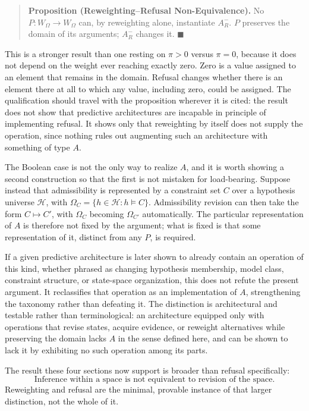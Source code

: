 \documentclass[11pt]{article}
\begin{document}
\begin{quote}
\textbf{Proposition (Reweighting–Refusal Non-Equivalence).} No $P : W_\Omega \rightarrow W_\Omega$ can, by reweighting alone, instantiate $A_R^-$. $P$ preserves the domain of its arguments; $A_R^-$ changes it. $\blacksquare$
\end{quote}

This is a stronger result than one resting on $\pi > 0$ versus $\pi = 0$, because it does not depend on the weight ever reaching exactly zero. Zero is a value assigned to an element that remains in the domain. Refusal changes whether there is an element there at all to which any value, including zero, could be assigned. The qualification should travel with the proposition wherever it is cited: the result does not show that predictive architectures are incapable in principle of implementing refusal. It shows only that reweighting by itself does not supply the operation, since nothing rules out augmenting such an architecture with something of type $A$.

The Boolean case is not the only way to realize $A$, and it is worth showing a second construction so that the first is not mistaken for load-bearing. Suppose instead that admissibility is represented by a constraint set $C$ over a hypothesis universe $\mathcal{H}$, with $\Omega_C = \{h \in \mathcal{H} : h \models C\}$. Admissibility revision can then take the form $C \mapsto C'$, with $\Omega_C$ becoming $\Omega_{C'}$ automatically. The particular representation of $A$ is therefore not fixed by the argument; what is fixed is that some representation of it, distinct from any $P$, is required.

If a given predictive architecture is later shown to already contain an operation of this kind, whether phrased as changing hypothesis membership, model class, constraint structure, or state-space organization, this does not refute the present argument. It reclassifies that operation as an implementation of $A$, strengthening the taxonomy rather than defeating it. The distinction is architectural and testable rather than terminological: an architecture equipped only with operations that revise states, acquire evidence, or reweight alternatives while preserving the domain lacks $A$ in the sense defined here, and can be shown to lack it by exhibiting no such operation among its parts.

The result these four sections now support is broader than refusal specifically:
\[
\boxed{\text{Inference within a space is not equivalent to revision of the space.}}
\]
Reweighting and refusal are the minimal, provable instance of that larger distinction, not the whole of it.
\end{document}
